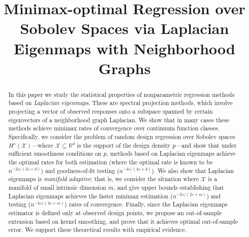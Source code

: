 \documentclass[aos]{imsart}
\theoremstyle{plain}
\theoremstyle{definition}
\theoremstyle{remark}
\def\R{\mathbb{R}}
\newcommand{\mc}[1]{\mathcal{#1}}
\newcommand{\Reals}{\mathbb{R}} %
\newcommand{\Rd}{\Reals^d}
\newcommand{\1}{\mathbf{1}}
\begin{document}
\begin{frontmatter}

\title{Minimax-optimal Regression over Sobolev Spaces via Laplacian Eigenmaps with Neighborhood Graphs}


\begin{abstract}
In this paper we study the statistical properties of nonparametric regression methods based on \emph{Laplacian eigenmaps}. These are spectral projection methods, which involve projecting a vector of observed responses onto a subspace spanned by certain eigenvectors of a neighborhood graph Laplacian. We show that in many cases these methods achieve minimax rates of convergence over continuum function classes. Specifically, we consider the problem of random design regression over Sobolev spaces $H^s(\mc{X})$---where $\mc{X} \subseteq \Rd$ is the support of the design density $p$---and show that under sufficient smoothness conditions on $p$, methods based on Laplacian eigenmaps achieve the optimal rates for both estimation (where the optimal rate is known to be $n^{-2s/(2s + d)}$) and goodness-of-fit testing ($n^{-4s/(4s + d)}$). We also show that Laplacian eigenmaps is \emph{manifold adaptive}: that is, we consider the situation where $\mc{X}$ is a manifold of small intrinsic dimension $m$, and give upper bounds establishing that Laplacian eigenmaps achieves the faster minimax estimation ($n^{-2s/(2s + m)}$) and testing ($n^{-4s/(4s + m)}$) rates of convergence. Finally, since the Laplacian eigenmaps estimator is defined only at observed design points, we propose an out-of-sample extension based on kernel smoothing, and prove that it achieves optimal out-of-sample error. We support these theoretical results with empirical evidence.
\end{abstract}

\begin{keyword}[class=MSC]
\end{keyword}

\begin{keyword}
\end{keyword}

\end{frontmatter}
\end{document}
